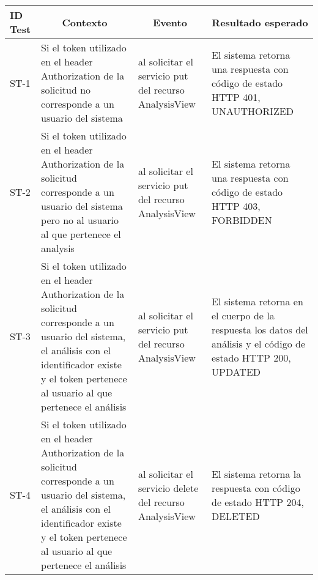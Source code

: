 \begin{longtable}{|m{1cm}|m{4cm}|m{4cm}|m{4cm}| }

	\hline
		\rowcolor[gray]{0.9} 
		\textbf{ID Test} & \multicolumn{1}{|c|}{\textbf{Contexto}} & \multicolumn{1}{|c|}{\textbf{Evento}} & \multicolumn{1}{|c|}{\textbf{Resultado esperado}} \\
	\hline
	\endhead
		ST-1 & Si el token utilizado en el header Authorization de la solicitud no corresponde a un usuario del sistema  & al solicitar el servicio put del recurso AnalysisView & El sistema retorna una respuesta con código de estado HTTP 401, UNAUTHORIZED\\
	\hline
		ST-2 & Si el token utilizado en el header Authorization de la solicitud corresponde a un usuario del sistema pero no al usuario al que pertenece el analysis & al solicitar el servicio put del recurso AnalysisView & El sistema retorna una respuesta con código de estado HTTP 403, FORBIDDEN\\
	\hline
		ST-3 & Si el token utilizado en el header Authorization de la solicitud corresponde a un usuario del sistema, el análisis con el identificador existe y el token pertenece al usuario al que pertenece el análisis & al solicitar el servicio put del recurso AnalysisView & El sistema retorna en el cuerpo de la respuesta los datos del análisis y el código de estado HTTP 200, UPDATED\\
	\hline
		ST-4 & Si el token utilizado en el header Authorization de la solicitud corresponde a un usuario del sistema, el análisis con el identificador existe y el token pertenece al usuario al que pertenece el análisis & al solicitar el servicio delete del recurso AnalysisView & El sistema retorna la respuesta con código de estado HTTP 204, DELETED\\
	\hline

\end{longtable}

